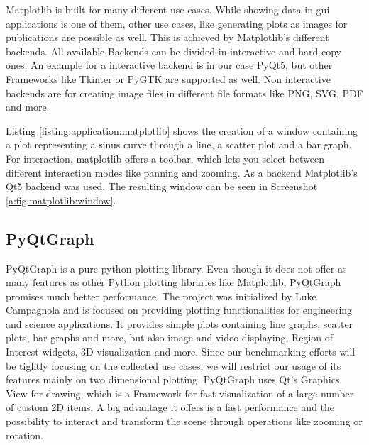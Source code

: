 Matplotlib is built for many different use cases. While showing data in
\gls{gui} applications is one of them, other use cases, like generating plots as
images for publications are possible as well. This is achieved by Matplotlib's
different backends. All available Backends can be divided in interactive and
hard copy ones. An example for a interactive backend is in our case PyQt5, but
other Frameworks like Tkinter or PyGTK are supported as well. Non interactive
backends are for creating image files in different file formats like PNG, SVG,
PDF and more.
\cite{MatplotlibIntro, PythonDataVis}

Listing \ref{listing:application:matplotlib} shows the creation of a window
containing a plot representing a sinus curve through a line, a scatter plot and
a bar graph. For interaction, matplotlib offers a toolbar, which lets you select
between different interaction modes like panning and zooming. As a backend
Matplotlib's Qt5 backend was used.  The resulting window can be seen in
Screenshot \ref{a:fig:matplotlib:window}.



\subsection{PyQtGraph} \label{sec:application:libraries:pyqtgraph}

PyQtGraph is a pure python plotting library. Even though it does not offer as
many features as other Python plotting libraries like Matplotlib, PyQtGraph
promises much better performance. The project was initialized by Luke Campagnola
and is focused on providing plotting functionalities for engineering and science
applications. It provides simple plots containing line graphs, scatter plots,
bar graphs and more, but also image and video displaying, Region of Interest
widgets, 3D visualization and more.  Since our benchmarking efforts will be
tightly focusing on the collected use cases, we will restrict our usage of its
features mainly on two dimensional plotting. PyQtGraph uses Qt's Graphics View
for drawing, which is a Framework for fast visualization of a large number of
custom 2D items. A big advantage it offers is a fast performance and the
possibility to interact and transform the scene through operations like
zooming or rotation.
\cite{GraphicsView}

